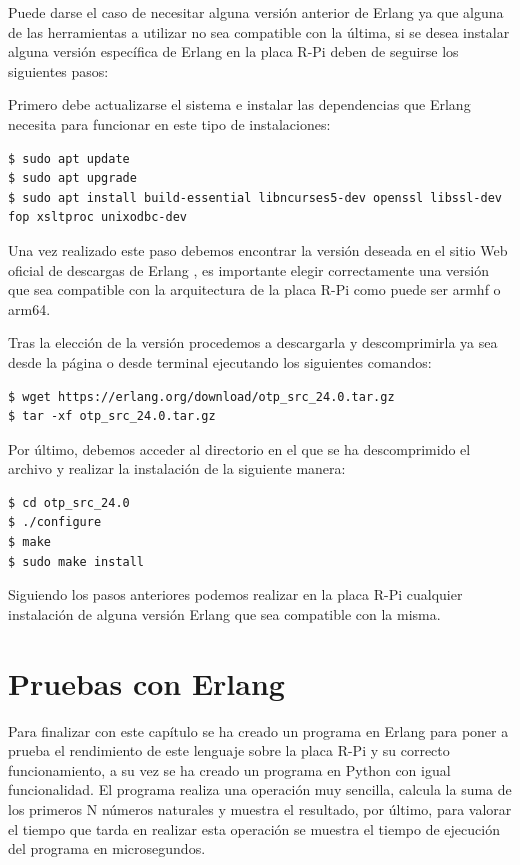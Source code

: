 Puede darse el caso de necesitar alguna versión anterior de Erlang ya que alguna de las herramientas a utilizar no sea compatible con la última, si se desea instalar alguna versión específica de Erlang en la placa R-Pi deben de seguirse los siguientes pasos:

Primero debe actualizarse el sistema e instalar las dependencias que Erlang necesita para funcionar en este tipo de instalaciones:\\
 
\begin{lstlisting}[style=terminal]
$ sudo apt update
$ sudo apt upgrade
$ sudo apt install build-essential libncurses5-dev openssl libssl-dev fop xsltproc unixodbc-dev
\end{lstlisting}

Una vez realizado este paso debemos encontrar la versión deseada en el sitio Web oficial de descargas de Erlang \cite{erlang.orgStart}, es importante elegir correctamente una versión que sea compatible con la arquitectura de la placa R-Pi como puede ser armhf o arm64.

Tras la elección de la versión procedemos a descargarla y descomprimirla ya sea desde la página o desde terminal ejecutando los siguientes comandos:\\

\begin{lstlisting}[style=terminal]
$ wget https://erlang.org/download/otp_src_24.0.tar.gz
$ tar -xf otp_src_24.0.tar.gz
\end{lstlisting}

Por último, debemos acceder al directorio en el que se ha descomprimido el archivo y realizar la instalación de la siguiente manera:\\

\begin{lstlisting}[style=terminal]
$ cd otp_src_24.0
$ ./configure
$ make
$ sudo make install
\end{lstlisting}

Siguiendo los pasos anteriores podemos realizar en la placa R-Pi cualquier instalación de alguna versión Erlang que sea compatible con la misma.

\section{Pruebas con Erlang}

Para finalizar con este capítulo se ha creado un programa en Erlang para poner a prueba el rendimiento de este lenguaje sobre la placa R-Pi y su correcto funcionamiento, a su vez se ha creado un programa en Python con igual funcionalidad. El programa realiza una operación muy sencilla, calcula la suma de los primeros N números naturales y muestra el resultado, por último, para valorar el tiempo que tarda en realizar esta operación se muestra el tiempo de ejecución del programa en microsegundos. 

